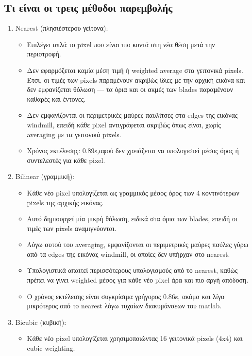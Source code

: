 \documentclass[12pt]{article}
\begin{document}
\subsection{Τι είναι οι τρεις μέθοδοι παρεμβολής}
\begin{enumerate}
  \item Nearest (πλησιέστερου γείτονα):    
   \begin{itemize}
    \item Επιλέγει απλά το pixel που είναι πιο κοντά στη νέα θέση μετά την περιστροφή.
    \item Δεν εφαρμόζεται καμία μέση τιμή ή weighted average στα γειτονικά pixels. Έτσι, οι τιμές των pixels παραμένουν ακριβώς ίδιες με την αρχική εικόνα και δεν εμφανίζεται θόλωση — τα όρια και οι ακμές των blades παραμένουν καθαρές και έντονες.
    \item Δεν εμφανίζονται οι περιμετρικές μαύρες παυλίτσες στα edges της εικόνας windmill, επειδή κάθε pixel αντιγράφεται ακριβώς όπως είναι, χωρίς averaging με τα γειτονικά pixels.
    \item Χρόνος εκτέλεσης: 0.89s,αφού δεν χρειάζεται να υπολογιστεί μέσος όρος ή συντελεστές για κάθε pixel.
   \end{itemize}
  \item Bilinear (γραμμική):
    \begin{itemize}
    \item Κάθε νέο pixel υπολογίζεται ως γραμμικός μέσος όρος των 4 κοντινότερων pixels της αρχικής εικόνας.
    \item Αυτό δημιουργεί μία μικρή θόλωση, ειδικά στα όρια των blades, επειδή οι τιμές των pixels αναμιγνύονται.
    \item Λόγω αυτού του averaging, εμφανίζονται οι περιμετρικές μαύρες παύλες γύρω από τα edges της εικόνας windmill, οι οποίες δεν υπήρχαν στο nearest.
    \item Υπολογιστικά απαιτεί περισσότερους υπολογισμούς από το nearest, καθώς πρέπει να γίνει weighted μέσος για κάθε νέο pixel άρα και πιο αργή απόδοση.
    \item Ο χρόνος εκτέλεσης είναι συγκρίσιμα γρήγορος 0.86s, ακόμα και λίγο μικρότερος από το nearest λόγω τυχαίων διακυμάνσεων του matlab.
   \end{itemize}               
  \item Bicubic (κυβική):   
   \begin{itemize}
    \item Κάθε νέο pixel υπολογίζεται χρησιμοποιώντας 16 γειτονικά pixels (4x4) και cubic weighting.

\end{itemize}
\end{enumerate}
\end{document}
